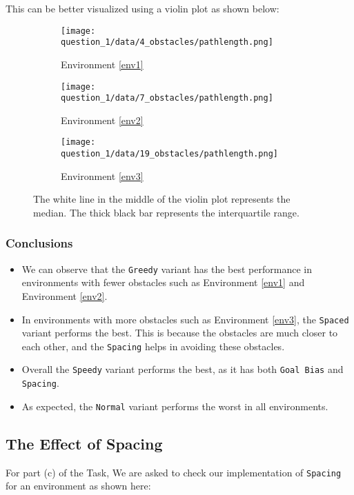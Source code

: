 \documentclass[12pt]{report}
\begin{document}
This can be better visualized using a violin plot as shown below:
\begin{figure}[H]
    \centering
    \begin{subfigure}{0.32\textwidth}
        \texttt{[image: question\_1/data/4\_obstacles/pathlength.png]}
        \caption{Environment \ref{env1}}
    \end{subfigure}
    \begin{subfigure}{0.32\textwidth}
        \texttt{[image: question\_1/data/7\_obstacles/pathlength.png]}
        \caption{Environment \ref{env2}}
    \end{subfigure}
    \begin{subfigure}{0.32\textwidth}
        \texttt{[image: question\_1/data/19\_obstacles/pathlength.png]}
        \caption{Environment \ref{env3}}
    \end{subfigure}
    \caption{The white line in the middle of the violin plot represents the median. The thick black bar represents the interquartile range.}
\end{figure}


\subsubsection{Conclusions}
\begin{itemize}
    \item We can observe that the \texttt{Greedy} variant has the best performance in environments with fewer obstacles such as Environment \ref{env1} and Environment \ref{env2}.
    \item In environments with more obstacles such as Environment \ref{env3}, the \texttt{Spaced} variant performs the best. This is because the obstacles are much closer to each other, and the \texttt{Spacing} helps in avoiding these obstacles.
    \item Overall the \texttt{Speedy} variant performs the best, as it has both \texttt{Goal Bias} and \texttt{Spacing}.
    \item As expected, the \texttt{Normal} variant performs the worst in all environments.
\end{itemize}


\subsection{The Effect of Spacing}

For part (c) of the Task, We are asked to check our implementation of \texttt{Spacing} for an environment as shown here:
\end{document}
